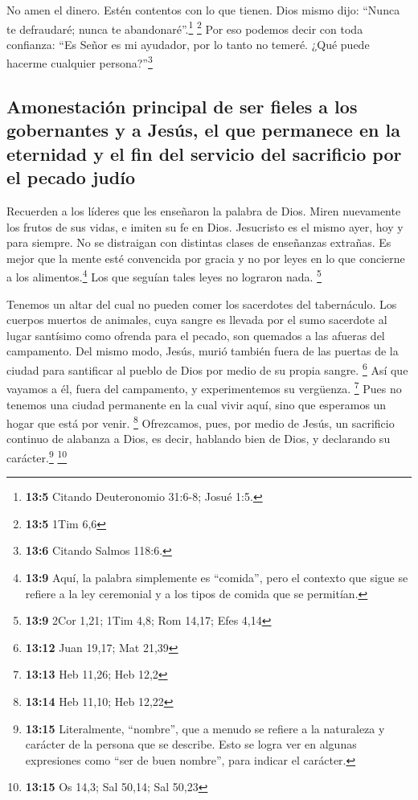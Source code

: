 No amen el dinero. Estén contentos con lo que tienen.
Dios mismo dijo: ``Nunca te defraudaré; nunca te
abandonaré''.\footnote{\textbf{13:5} Citando Deuteronomio 31:6-8; Josué
  1:5.} \footnote{\textbf{13:5} 1Tim 6,6}  Por eso podemos
decir con toda confianza: ``Es Señor es mi ayudador, por lo tanto no
temeré. ¿Qué puede hacerme cualquier persona?''\footnote{\textbf{13:6}
  Citando Salmos 118:6.}

\hypertarget{amonestaciuxf3n-principal-de-ser-fieles-a-los-gobernantes-y-a-jesuxfas-el-que-permanece-en-la-eternidad-y-el-fin-del-servicio-del-sacrificio-por-el-pecado-juduxedo}{%
\subsection{Amonestación principal de ser fieles a los gobernantes y a
Jesús, el que permanece en la eternidad y el fin del servicio del
sacrificio por el pecado
judío}\label{amonestaciuxf3n-principal-de-ser-fieles-a-los-gobernantes-y-a-jesuxfas-el-que-permanece-en-la-eternidad-y-el-fin-del-servicio-del-sacrificio-por-el-pecado-juduxedo}}

 Recuerden a los líderes que les enseñaron la palabra de
Dios. Miren nuevamente los frutos de sus vidas, e imiten su fe en Dios.
 Jesucristo es el mismo ayer, hoy y para siempre.
 No se distraigan con distintas clases de enseñanzas
extrañas. Es mejor que la mente esté convencida por gracia y no por
leyes en lo que concierne a los alimentos.\footnote{\textbf{13:9} Aquí,
  la palabra simplemente es ``comida'', pero el contexto que sigue se
  refiere a la ley ceremonial y a los tipos de comida que se permitían.}
Los que seguían tales leyes no lograron nada. \footnote{\textbf{13:9}
  2Cor 1,21; 1Tim 4,8; Rom 14,17; Efes 4,14}

 Tenemos un altar del cual no pueden comer los sacerdotes
del tabernáculo.  Los cuerpos muertos de animales, cuya
sangre es llevada por el sumo sacerdote al lugar santísimo como ofrenda
para el pecado, son quemados a las afueras del campamento.
 Del mismo modo, Jesús, murió también fuera de las
puertas de la ciudad para santificar al pueblo de Dios por medio de su
propia sangre. \footnote{\textbf{13:12} Juan 19,17; Mat 21,39}
 Así que vayamos a él, fuera del campamento, y
experimentemos su vergüenza. \footnote{\textbf{13:13} Heb 11,26; Heb
  12,2}  Pues no tenemos una ciudad permanente en la cual
vivir aquí, sino que esperamos un hogar que está por venir. \footnote{\textbf{13:14}
  Heb 11,10; Heb 12,22}  Ofrezcamos, pues, por medio de
Jesús, un sacrificio continuo de alabanza a Dios, es decir, hablando
bien de Dios, y declarando su carácter.\footnote{\textbf{13:15}
  Literalmente, ``nombre'', que a menudo se refiere a la naturaleza y
  carácter de la persona que se describe. Esto se logra ver en algunas
  expresiones como ``ser de buen nombre'', para indicar el carácter.}
\footnote{\textbf{13:15} Os 14,3; Sal 50,14; Sal 50,23}

